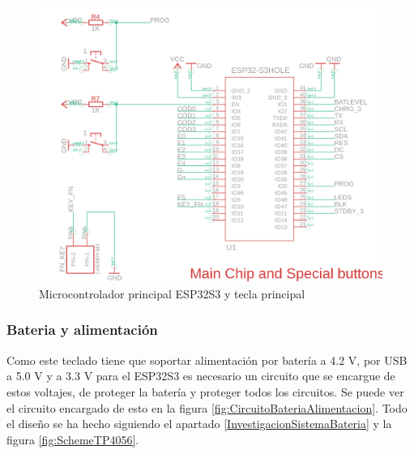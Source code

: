 \begin{figure}[H]
    \centering
    \includegraphics[width=1.0\textwidth]{imagenes/Capitulos/Cap04/CHIP.png}
    \caption{Microcontrolador principal ESP32S3 y tecla principal \cite{Repo:ImagenCircuito}}
    \label{fig:ESP32S3Circuito}
\end{figure}

\newpage
\subsubsection{Bateria y alimentación}
Como este teclado tiene que soportar alimentación por batería a 4.2 V, por \gls{USB} a 5.0 V y a 3.3 V para el ESP32S3 es necesario un circuito que se encargue de estos voltajes, de proteger la batería y proteger todos los circuitos. Se puede ver el circuito encargado de esto en la figura \ref{fig:CircuitoBateriaAlimentacion}. Todo el diseño se ha hecho siguiendo el apartado \ref{InvestigacionSistemaBateria} y la figura \ref{fig:SchemeTP4056}.


